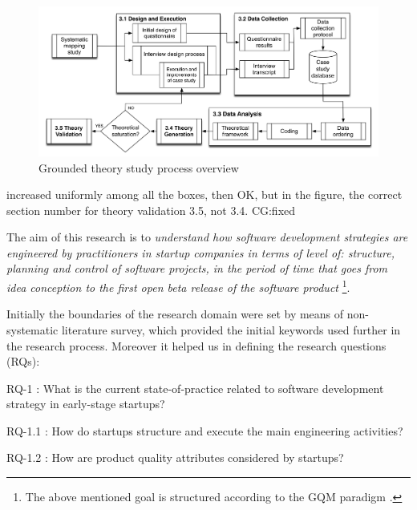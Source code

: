 \documentclass[12pt,journal,compsoc]{../sty/IEEEtran}
\let\MYoriglatexcaption\caption %
\renewcommand{\caption}[2][\relax]{\MYoriglatexcaption[#2]{#2}} %
\begin{document}
\begin{figure}[!t] \centering
\includegraphics[width=5in]{figures/completemethodology2} \caption{Grounded
theory study process overview} \label{fig:gt:completemethodology} \end{figure}
increased uniformly among all the boxes, then  %
OK, but in the figure, the correct section number for theory validation  %
3.5, not 3.4. CG:fixed

The aim of this research is to \textit{understand how software development
strategies are engineered by practitioners in startup companies in terms of
level of: structure, planning and control of software projects, in the period of
time  that goes from idea conception to the first open beta release of the
software product} \footnote{The above mentioned goal is structured according to
the GQM paradigm \cite{Basili1992}.}.

Initially the boundaries of the research domain were set by means of  non-
systematic literature survey, which provided the initial keywords used  further
in the research process. Moreover it helped us in defining the research
questions (RQs):


\begin{compactitem}

\item RQ-1 : What is the current state-of-practice related to software
development strategy in early-stage startups? \begin{compactitem}

\item RQ-1.1 : How do startups structure and execute the main engineering
activities? \item RQ-1.2 : How are product quality attributes considered by
startups? \end{compactitem}

\end{compactitem}
\end{document}
